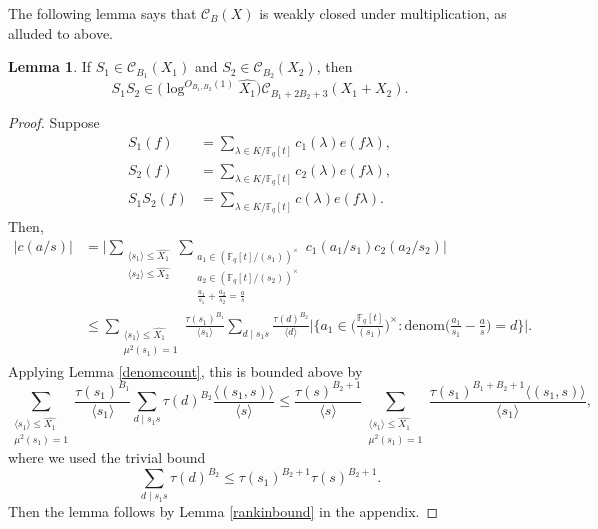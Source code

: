 \documentclass{article}
\theoremstyle{definition}
\newtheorem{lem}{Lemma}[section]
\theoremstyle{definition}
\theoremstyle{remark}
\newcommand{\F}{\mathbb{F}_q[t]}
\newcommand{\1}{\mathbf{1}}
\numberwithin{equation}{section}
\begin{document}
The following lemma says that $\mathcal{C}_B(X)$ is weakly closed under multiplication, as alluded to above. 
\begin{lem}\label{exposumclosed}
If $S_1\in \mathcal{C}_{B_1}(X_1)$ and $S_2\in \mathcal{C}_{B_2}(X_2)$, then 
\[S_1S_2\in \big(\log^{O_{B_1,B_2}(1)}\widehat{X_1}\big)\mathcal{C}_{B_1+2B_2+3}(X_1+X_2).\]
\end{lem}
\begin{proof}
Suppose 
\begin{align*}
S_1(f)&=\sum_{\lambda\in K\slash \F}c_1(\lambda)e(f\lambda),\\
S_2(f)&=\sum_{\lambda\in K\slash \F}c_2(\lambda)e(f\lambda),\\
S_1S_2(f)&=\sum_{\lambda\in K\slash \F}c(\lambda)e(f\lambda).
\end{align*}
Then,
\begin{align*}
|c(a\slash s)|&=\Bigg|\sum_{\substack{\langle s_1\rangle \leq \widehat{X_1}\\\langle s_2\rangle \leq \widehat{X_2}}}\sum_{\substack{a_1\in (\F\slash (s_1))^\times \\a_2\in (\F\slash (s_2))^\times\\\frac{a_1}{s_1}+\frac{a_2}{s_2}=\frac{a}{s}}} c_1(a_1\slash s_1)c_2(a_2\slash s_2)\Bigg|\\
&\leq \sum_{\substack{\langle s_1 \rangle \leq \widehat{X_1}\\\mu^2(s_1)=1}}\frac{\tau(s_1)^{B_1}}{\langle s_1 \rangle }\sum_{d\mid s_1s}\frac{\tau(d)^{B_2}}{\langle d \rangle }\bigg|\bigg\{a_1\in \bigg(\frac{\F}{(s_1)}\bigg)^\times: \text{denom}\bigg(\frac{a_1}{s_1}-\frac{a}{s}\bigg)=d\bigg\}\bigg|.
\end{align*}
Applying Lemma \ref{denomcount}, this is bounded above by 
\[\sum_{\substack{\langle s_1 \rangle \leq \widehat{X_1}\\\mu^2(s_1)=1}}\frac{\tau(s_1)^{B_1}}{\langle s_1 \rangle }\sum_{d\mid s_1s}\tau(d)^{B_2}\frac{\langle (s_1,s)\rangle }{\langle s \rangle }\leq \frac{\tau(s)^{B_2+1}}{\langle s \rangle }\sum_{\substack{\langle s_1 \rangle \leq \widehat{X_1}\\\mu^2(s_1)=1}}\frac{\tau(s_1)^{B_1+B_2+1}\langle(s_1,s)\rangle }{\langle s_1\rangle },\]
where we used the trivial bound 
\[\sum_{d\mid s_1s}\tau(d)^{B_2}\leq \tau(s_1)^{B_2+1}\tau(s)^{B_2+1}.\]
Then the lemma follows by Lemma \ref{rankinbound} in the appendix.
\end{proof}
\end{document}
